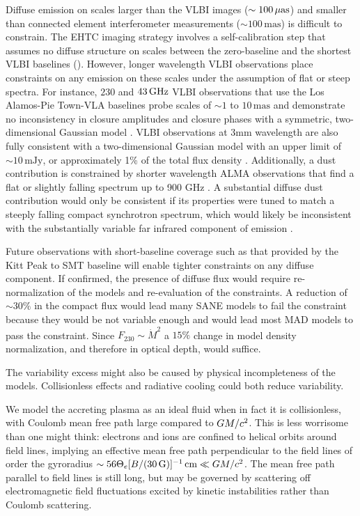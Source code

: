 Diffuse emission on scales larger than the VLBI images ($\sim 100\,\mathrm{\mu as}$) and smaller than connected element interferometer measurements ($\sim 100\,\mathrm{mas}$) is difficult to constrain.
The EHTC imaging strategy involves a self-calibration step that assumes no diffuse structure on scales between the zero-baseline and the shortest VLBI baselines ().
However, longer wavelength VLBI observations place constraints on any emission on these scales under the assumption of flat or steep spectra.
For instance, $230$ and $43\,\mathrm{GHz}$ VLBI observations that use the Los Alamos-Pie Town-VLA baselines probe scales of $\sim 1$ to $10\,\mathrm{mas}$ and demonstrate no inconsistency in closure amplitudes and closure phases with a symmetric, two-dimensional Gaussian model \citep{2004Sci...304..704B}.
VLBI observations at 3mm wavelength are also fully consistent with a two-dimensional Gaussian model with an upper limit of $\sim 10\,\mathrm{mJy}$, or approximately 1\% of the total flux density \citep{2019A&A...621A.119B}.
Additionally, a dust contribution is constrained by shorter wavelength ALMA observations that find a flat or slightly falling spectrum up to 900 GHz \citep{2019ApJ...881L...2B}.
A substantial diffuse dust contribution would only be consistent if its properties were tuned to match a steeply falling compact synchrotron spectrum, which would likely be inconsistent with the substantially variable far infrared component of \sgra emission \citep{2016ApJ...825...32S, 2018ApJ...862..129V}.

Future observations with short-baseline coverage such as that provided by the Kitt Peak to SMT baseline will enable tighter constraints on any diffuse component.
If confirmed, the presence of diffuse flux would require re-normalization of the models and re-evaluation of the constraints.
A reduction of $\sim 30\%$ in the compact flux would lead many SANE models to fail the  constraint because they would be not variable enough and would lead most MAD models to pass the  constraint.
Since $F_{230} \sim \dot{M}^2$ a $15\%$ change in model density normalization, and therefore in optical depth, would suffice.

The variability excess might also be caused by physical incompleteness of the models.
Collisionless effects and radiative cooling could both reduce variability.

We model the accreting plasma as an ideal fluid when in fact it is collisionless, with Coulomb mean free path large compared to $GM/c^2$.
This is less worrisome than one might think: electrons and ions are confined to helical orbits around field lines, implying an effective mean free path perpendicular to the field lines of order the gyroradius $\sim 56 \Theta_e [B/(30\,\mathrm{G})]^{-1} \,\mathrm{cm} \ll GM/c^2$.
The mean free path parallel to field lines is still long, but may be governed by scattering off electromagnetic field fluctuations excited by kinetic instabilities rather than Coulomb scattering.

